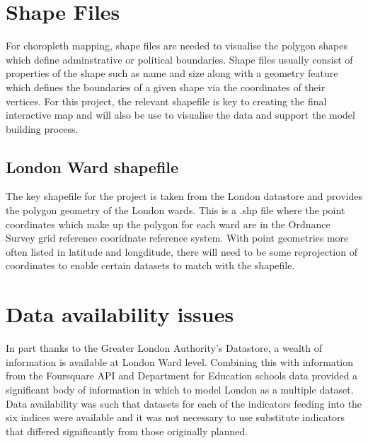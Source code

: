 
\section{Shape Files}

For choropleth mapping, shape files are needed to visualise the polygon shapes which define adminstrative or political boundaries. Shape files usually consist of properties of the shape such as name and size along with a geometry feature which defines the boundaries of a given shape via the coordinates of their vertices. For this project, the relevant shapefile is key to creating the final interactive map and will also be use to visualise the data and support the model building process.  

\subsection{London Ward shapefile}

The key shapefile for the project is taken from the London datastore and provides the polygon geometry of the London wards. This is a .shp file where the point coordinates which make up the polygon for each ward are in the Ordnance Survey grid reference cooridnate reference system. With point geometries more often listed in latitude and longditude, there will need to be some reprojection of coordinates to enable certain datasets to match with the shapefile.


\section{Data availability issues}

In part thanks to the Greater London Authority’s Datastore, a wealth of information is available at London Ward level. Combining this with information from the Foursquare API and Department for Education schools data provided a significant body of information in which to model London as a multiple dataset.
Data availability was such that datasets for each of the indicators feeding into the six indices were available and it was not necessary to use substitute indicators that differed significantly from those originally planned. 


